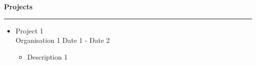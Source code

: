 

\textbf{Projects}

\par\noindent\rule{\textwidth}{0.2pt}

\begin{itemize}
    \item {{Project 1} \\ %
            {Organisation 1} \hfill {Date 1 - Date 2} %
            {%
                \begin{itemize}
                    \item {Description 1}
                \end{itemize}
            }}
\end{itemize}
